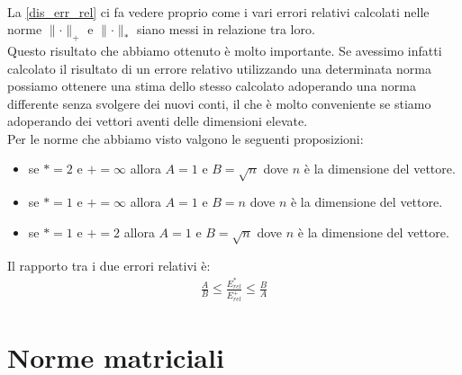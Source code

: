 \documentclass[12pt, a4paper]{book}
\theoremstyle{definition}
\begin{document}
\begin{flushleft}
\begin{equation}
\begin{split}
	\end{split}
\end{equation}
La \ref{dis_err_rel} ci fa vedere proprio come i vari errori relativi calcolati nelle norme $\lVert \cdot \rVert_{+}$ e $\lVert \cdot \rVert_{*}$ siano messi in relazione tra loro. \\
Questo risultato che abbiamo ottenuto è molto importante. Se avessimo infatti calcolato il risultato di un errore relativo utilizzando una determinata norma possiamo ottenere una stima dello stesso calcolato adoperando una norma differente senza svolgere dei nuovi conti, il che è molto conveniente se stiamo adoperando dei vettori aventi delle dimensioni elevate.\\
 
Per le norme che abbiamo visto valgono le seguenti proposizioni:  
\begin{itemize}
	\item se $*= 2$ e $+ = \infty$ allora $A=1$ e $B=\sqrt{n}$ dove $n$ è la dimensione del vettore.
	\item se $*= 1$ e $+ = \infty$ allora $A=1$ e $B=n$ dove $n$ è la dimensione del vettore.
	\item se $*= 1$ e $+ = 2$ allora $A=1$ e $B=\sqrt{n}$ dove $n$ è la dimensione del vettore.
\end{itemize}

Il rapporto tra i due errori relativi è:
\begin{equation} \label{dis_err_rel}
	\begin{split}
		\frac{A}{B} \leq \frac{E_{rel}^{*}}{E_{rel}^{
		+}} \leq \frac{B}{A}
	\end{split}
\end{equation}
\end{flushleft}
\newpage

\section{Norme matriciali}
\end{document}
